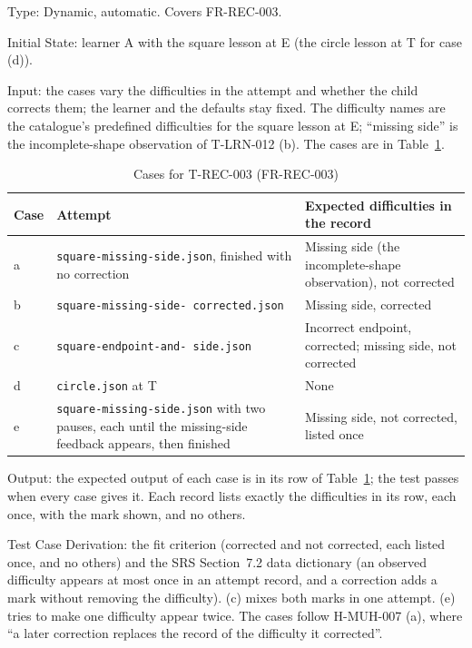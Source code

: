 \documentclass[12pt, titlepage]{article}
\begin{document}
\begin{enumerate}
Type: Dynamic, automatic. Covers FR-REC-003.

Initial State: learner A with the square lesson at E (the circle lesson at
T for case (d)).

Input: the cases vary the difficulties in the attempt and whether the child
corrects them; the learner and the defaults stay fixed. The difficulty
names are the catalogue's predefined difficulties for the square lesson at
E; ``missing side'' is the incomplete-shape observation of T-LRN-012 (b).
The cases are in Table~\ref{tab:t-rec-003}.

\begin{table}[htbp]
\centering\small
\caption{Cases for T-REC-003 (FR-REC-003)}
\label{tab:t-rec-003}
\begin{tabularx}{\textwidth}{@{}l >{\raggedright\arraybackslash}X
  >{\raggedright\arraybackslash}X@{}}
\toprule
\textbf{Case} & \textbf{Attempt} &
\textbf{Expected difficulties in the record}\\
\midrule
a & \texttt{square-\allowbreak{}missing-\allowbreak{}side.json}, finished
with no correction & Missing side (the incomplete-shape observation), not
corrected\\
b & \texttt{square-\allowbreak{}missing-\allowbreak{}side-\allowbreak{}%
corrected.json} & Missing side, corrected\\
c & \texttt{square-\allowbreak{}endpoint-\allowbreak{}and-\allowbreak{}%
side.json} & Incorrect endpoint, corrected; missing side, not corrected\\
d & \texttt{circle.json} at T & None\\
e & \texttt{square-\allowbreak{}missing-\allowbreak{}side.json} with two
pauses, each until the missing-side feedback appears, then finished &
Missing side, not corrected, listed once\\
\bottomrule
\end{tabularx}
\end{table}

Output: the expected output of each case is in its row of
Table~\ref{tab:t-rec-003}; the test passes when every case gives it. Each
record lists exactly the difficulties in its row, each once, with the mark
shown, and no others.

Test Case Derivation: the fit criterion (corrected and not corrected, each
listed once, and no others) and the SRS Section~7.2 data dictionary (an
observed difficulty appears at most once in an attempt record, and a
correction adds a mark without removing the difficulty). (c) mixes both
marks in one attempt. (e) tries to make one difficulty appear twice. The
cases follow H-MUH-007 (a), where ``a later correction replaces the record
of the difficulty it corrected''.


\end{enumerate}
\end{document}
